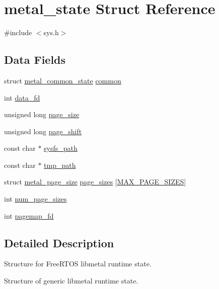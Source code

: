 \hypertarget{structmetal__state}{}\section{metal\+\_\+state Struct Reference}
\label{structmetal__state}


{\ttfamily \#include $<$sys.\+h$>$}

\subsection*{Data Fields}
\begin{DoxyCompactItemize}
\item 
struct \hyperlink{structmetal__common__state}{metal\+\_\+common\+\_\+state} \hyperlink{structmetal__state_aa36ac30ed6ef6439baea425191af0968}{common}
\item 
int \hyperlink{structmetal__state_acb0f8a3441201130f4d59045d66d9b77}{data\+\_\+fd}
\item 
unsigned long \hyperlink{structmetal__state_a3ce0623d9131ad2f99e47e78ec3feba3}{page\+\_\+size}
\item 
unsigned long \hyperlink{structmetal__state_ac47375715b2e69ecb17b3a3714ae5c42}{page\+\_\+shift}
\item 
const char $\ast$ \hyperlink{structmetal__state_adb50fd0d288917778f721619dcaba32e}{sysfs\+\_\+path}
\item 
const char $\ast$ \hyperlink{structmetal__state_a290af954fe910c5caa1ded1e32e626b6}{tmp\+\_\+path}
\item 
struct \hyperlink{structmetal__page__size}{metal\+\_\+page\+\_\+size} \hyperlink{structmetal__state_a4488b4117a68b92e40c0c04f53f7310b}{page\+\_\+sizes} \mbox{[}\hyperlink{system_2linux_2sys_8h_a7b18d1d6935a27d9929f039a106515e5}{M\+A\+X\+\_\+\+P\+A\+G\+E\+\_\+\+S\+I\+Z\+ES}\mbox{]}
\item 
int \hyperlink{structmetal__state_a08ea681743f49b2410a685518b033ce3}{num\+\_\+page\+\_\+sizes}
\item 
int \hyperlink{structmetal__state_a197661bddfd13e2af962db5802989261}{pagemap\+\_\+fd}
\end{DoxyCompactItemize}


\subsection{Detailed Description}
Structure for Free\+R\+T\+OS libmetal runtime state.

Structure of generic libmetal runtime state.

